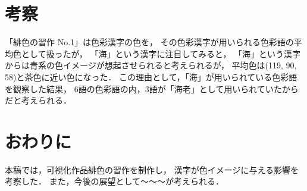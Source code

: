 \documentclass[a4j,twocolumn]{ujarticle} %
\newcommand{\workname}{緋色の習作}
\newcommand{\colorname}{色彩語}
\newcommand{\colorkanji}{色彩漢字}
\newcommand{\recallcolor}{色イメージ}
\begin{document}
% 
% 
% 




\section{考察}

「\workname{} No.1」は\colorkanji{}の色を，
その\colorkanji{}が用いられる\colorname{}の平均色として扱ったが，
「海」という漢字に注目してみると，
「海」という漢字からは青系の\recallcolor{}が想起させられると考えられるが，
平均色は(119, 90, 58)と茶色に近い色になった．
この理由として，「海」が用いられている\colorname{}を観察した結果，
6語の\colorname{}の内，3語が「海老」として用いられていたからだと考えられる．

\section{おわりに}

本稿では，可視化作品\workname{}を制作し，
漢字が\recallcolor{}に与える影響を考察した．
また，今後の展望として〜〜〜が考えられる．




\end{document}
